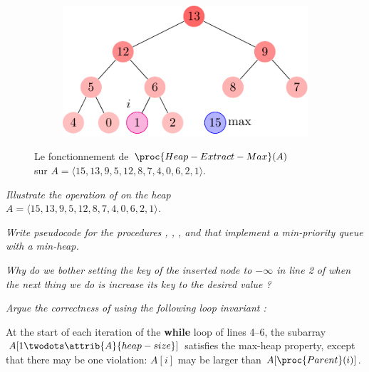\begin{description}
\begin{ex}
\begin{figure}[H]
\begin{subfigure}[t]{.40\textwidth}
          \centering
          \includegraphics[scale=0.8]{img/6_5-1/6_5-1_6}
          \caption{}\label{fig:6_5-1_6}
        \end{subfigure}
        \caption{\centering Le fonctionnement de $\proc{Heap-Extract-Max}(A)$\\ sur $A = \langle 15, 13, 9, 5, 12, 8, 7, 4, 0, 6, 2,1 \rangle$.} 
        \label{fig:Heap-Extract-Max}
      \end{figure}
        \end{ex}
     \textit{Illustrate the operation of  on the heap \\$A = \langle 15, 13, 9, 5, 12, 8, 7, 4, 0, 6, 2,1 \rangle$.}
        \begin{exrev}
          
        \end{exrev}
     \textit{Write pseudocode for the procedures , , , and  that implement a min-priority queue with a min-heap.}
        \begin{exrev}
          
        \end{exrev}
     \textit{Why do we bother setting the key of the inserted node to $-\infty$ in line 2 of  when the next thing we do is increase its key to the desired value ?}
        \begin{exrev}
          
        \end{exrev}
     {\itshape Argue the correctness of  using the following loop invariant :

At the start of each iteration of the \textbf{while} loop of lines 4–6, the subarray
$A[1 \twodots \attrib{A}{heap-size}]$ satisfies the max-heap property, except that there may
be one violation: $A[i]$ may be larger than $A[\proc{Parent}(i)]$.

}
\end{description}
